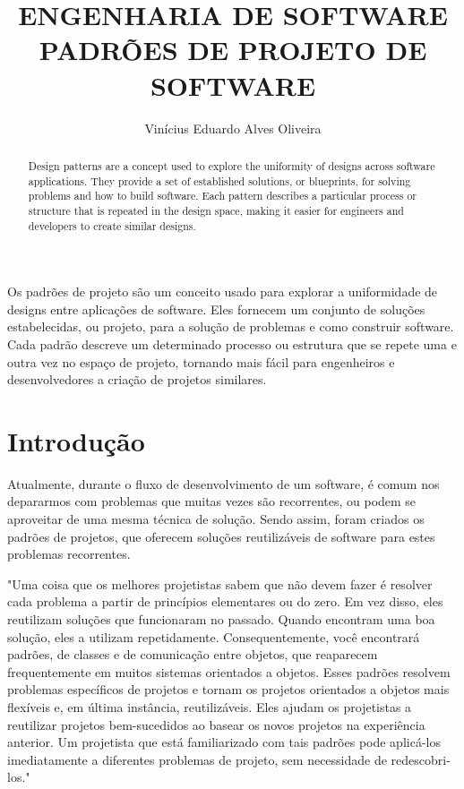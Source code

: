 \documentclass[12pt]{article}
\title{ENGENHARIA DE SOFTWARE\\ PADRÕES DE PROJETO DE SOFTWARE}
\author{Vinícius Eduardo Alves Oliveira\inst{1}}
\begin{document}
 

\maketitle

\begin{abstract}
  Design patterns are a concept used to explore the uniformity of designs across software applications. They provide a set of established solutions, or blueprints, for solving problems and how to build software. Each pattern describes a particular process or structure that is repeated in the design space, making it easier for engineers and developers to create similar designs.
\end{abstract}
     
\begin{resumo} 
  Os padrões de projeto são um conceito usado para explorar a uniformidade de designs entre aplicações de software. Eles fornecem um conjunto de soluções estabelecidas, ou projeto, para a solução de problemas e como construir software. Cada padrão descreve um determinado processo ou estrutura que se repete uma e outra vez no espaço de projeto, tornando mais fácil para engenheiros e desenvolvedores a criação de projetos similares.
\end{resumo}


\section{Introdução}

Atualmente, durante o fluxo de desenvolvimento de um software, é comum nos 
depararmos com problemas que muitas vezes são recorrentes, ou podem se aproveitar 
de uma mesma técnica de solução. Sendo assim, foram criados os padrões de 
projetos, que oferecem soluções reutilizáveis de software para estes 
problemas recorrentes.

"Uma coisa que os melhores projetistas sabem que não devem fazer é resolver 
cada problema a partir de princípios elementares ou do zero. Em vez disso, 
eles reutilizam soluções que funcionaram no passado. Quando encontram uma 
boa solução, eles a utilizam repetidamente. Consequentemente, você 
encontrará padrões, de classes e de comunicação entre objetos, que 
reaparecem frequentemente em muitos sistemas orientados a objetos. 
Esses padrões resolvem problemas específicos de projetos e tornam os 
projetos orientados a objetos mais flexíveis e, em última instância, 
reutilizáveis. Eles ajudam os projetistas a reutilizar projetos 
bem-sucedidos ao basear os novos projetos na experiência anterior. 
Um projetista que está familiarizado com tais padrões pode aplicá-los 
imediatamente a diferentes problemas de projeto, sem necessidade de 
redescobri-los." \cite{gof}
\end{document}
